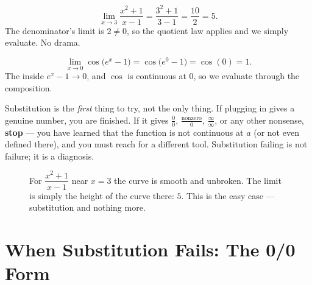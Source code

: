 \begin{example}
\label{ch07:ex-subst1}
\[
  \lim_{x\to 3} \frac{x^{2}+1}{x-1}
  = \frac{3^{2}+1}{3-1}
  = \frac{10}{2}
  = 5.
\]
The denominator's limit is $2\neq 0$, so the quotient law applies and we
simply evaluate. No drama.
\end{example}

\begin{example}
\label{ch07:ex-subst2}
\[
  \lim_{x\to 0} \cos\!\big(e^{x} - 1\big)
  = \cos\!\big(e^{0} - 1\big)
  = \cos(0) = 1.
\]
The inside $e^{x}-1 \to 0$, and $\cos$ is continuous at $0$, so we evaluate
through the composition.
\end{example}

\begin{trapbox}
Substitution is the \emph{first} thing to try, not the only thing. If plugging
in gives a genuine number, you are finished. If it gives $\frac{0}{0}$,
$\frac{\text{nonzero}}{0}$, $\frac{\infty}{\infty}$, or any other
nonsense, \textbf{stop} --- you have learned that the function is not
continuous at $a$ (or not even defined there), and you must reach for a
different tool. Substitution failing is not failure; it is a diagnosis.
\end{trapbox}

\begin{figure}[h]
\centering
{}
\caption{For $\dfrac{x^{2}+1}{x-1}$ near $x=3$ the curve is smooth and
unbroken. The limit is simply the height of the curve there: $5$. This is the
easy case --- substitution and nothing more.}
\label{ch07:fig-subst}
\end{figure}

\section{When Substitution Fails: The 0/0 Form}
\label{ch07:zerozero}

